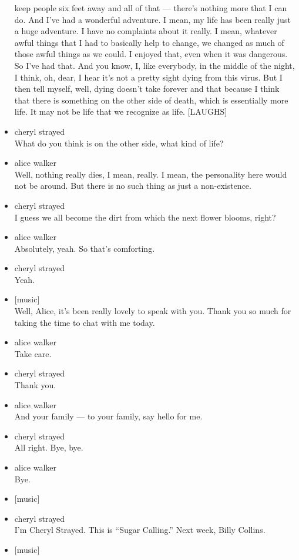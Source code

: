 \begin{itemize}
  keep people six feet away and all of that --- there's nothing more
  that I can do. And I've had a wonderful adventure. I mean, my life has
  been really just a huge adventure. I have no complaints about it
  really. I mean, whatever awful things that I had to basically help to
  change, we changed as much of those awful things as we could. I
  enjoyed that, even when it was dangerous. So I've had that. And you
  know, I, like everybody, in the middle of the night, I think, oh,
  dear, I hear it's not a pretty sight dying from this virus. But I then
  tell myself, well, dying doesn't take forever and that because I think
  that there is something on the other side of death, which is
  essentially more life. It may not be life that we recognize as life.
  {[}LAUGHS{]}
\item
  cheryl strayed\\
  What do you think is on the other side, what kind of life?
\item
  alice walker\\
  Well, nothing really dies, I mean, really. I mean, the personality
  here would not be around. But there is no such thing as just a
  non-existence.
\item
  cheryl strayed\\
  I guess we all become the dirt from which the next flower blooms,
  right?
\item
  alice walker\\
  Absolutely, yeah. So that's comforting.
\item
  cheryl strayed\\
  Yeah.
\item
  {[}music{]}\\
  Well, Alice, it's been really lovely to speak with you. Thank you so
  much for taking the time to chat with me today.
\item
  alice walker\\
  Take care.
\item
  cheryl strayed\\
  Thank you.
\item
  alice walker\\
  And your family --- to your family, say hello for me.
\item
  cheryl strayed\\
  All right. Bye, bye.
\item
  alice walker\\
  Bye.
\item
  {[}music{]}
\item
  cheryl strayed\\
  I'm Cheryl Strayed. This is ``Sugar Calling.'' Next week, Billy
  Collins.
\item
  {[}music{]}
\end{itemize}

